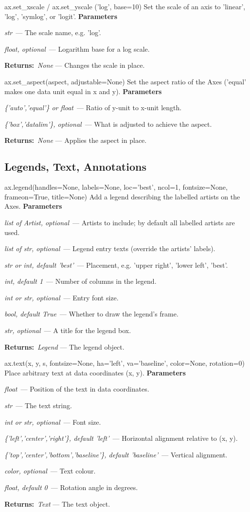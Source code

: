 \documentclass[10pt]{article}
\newenvironment{params}
  {\smallskip\textbf{\small\color{accent}Parameters}\par\nopagebreak
   \begin{description}[leftmargin=1.3em,itemsep=1.5pt,parsep=0pt,topsep=1pt,
      labelindent=0pt,style=sameline,font=\normalfont]}
  {\end{description}}
\newcommand{\pitem}[3]{\item[{\ttfamily\color{accent}#1}]{\itshape #2}\ --- #3}
\newcommand{\preturn}[2]{\smallskip\textbf{\small\color{accent}Returns:}\ {\itshape #1} --- #2\par}
\begin{document}
\begin{func}{ax.set\_xscale / ax.set\_yscale ('log', base=10)}
Set the scale of an axis to 'linear', 'log', 'symlog', or 'logit'.
\begin{params}
\pitem{value}{str}{The scale name, e.g. 'log'.}
\pitem{base}{float, optional}{Logarithm base for a log scale.}
\end{params}
\preturn{None}{Changes the scale in place.}
\end{func}
\medskip

\begin{func}{ax.set\_aspect(aspect, adjustable=None)}
Set the aspect ratio of the Axes ('equal' makes one data unit equal in x and y).
\begin{params}
\pitem{aspect}{\{'auto','equal'\} or float}{Ratio of y-unit to x-unit length.}
\pitem{adjustable}{\{'box','datalim'\}, optional}{What is adjusted to achieve the aspect.}
\end{params}
\preturn{None}{Applies the aspect in place.}
\end{func}
\medskip

\subsection{Legends, Text, Annotations}
\begin{func}{ax.legend(handles=None, labels=None, loc='best', ncol=1, fontsize=None, frameon=True, title=None)}
Add a legend describing the labelled artists on the Axes.
\begin{params}
\pitem{handles}{list of Artist, optional}{Artists to include; by default all labelled artists are used.}
\pitem{labels}{list of str, optional}{Legend entry texts (override the artists' labels).}
\pitem{loc}{str or int, default 'best'}{Placement, e.g. 'upper right', 'lower left', 'best'.}
\pitem{ncol}{int, default 1}{Number of columns in the legend.}
\pitem{fontsize}{int or str, optional}{Entry font size.}
\pitem{frameon}{bool, default True}{Whether to draw the legend's frame.}
\pitem{title}{str, optional}{A title for the legend box.}
\end{params}
\preturn{Legend}{The legend object.}
\end{func}
\medskip

\begin{func}{ax.text(x, y, s, fontsize=None, ha='left', va='baseline', color=None, rotation=0)}
Place arbitrary text at data coordinates (x, y).
\begin{params}
\pitem{x, y}{float}{Position of the text in data coordinates.}
\pitem{s}{str}{The text string.}
\pitem{fontsize}{int or str, optional}{Font size.}
\pitem{ha}{\{'left','center','right'\}, default 'left'}{Horizontal alignment relative to (x, y).}
\pitem{va}{\{'top','center','bottom','baseline'\}, default 'baseline'}{Vertical alignment.}
\pitem{color}{color, optional}{Text colour.}
\pitem{rotation}{float, default 0}{Rotation angle in degrees.}
\end{params}
\preturn{Text}{The text object.}
\end{func}
\medskip
\end{document}
